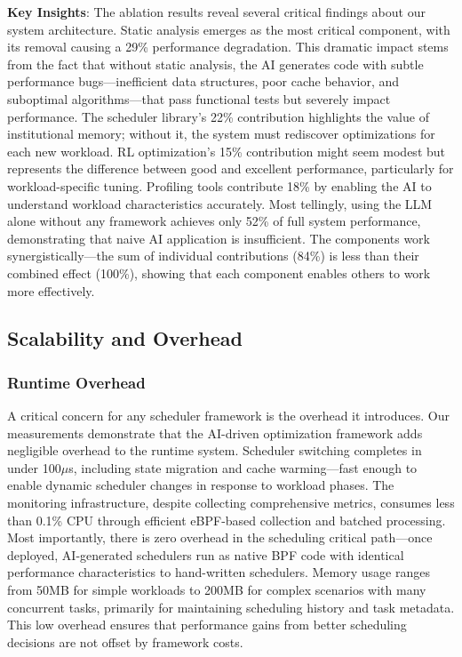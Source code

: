 \textbf{Key Insights}: The ablation results reveal several critical findings about our system architecture. Static analysis emerges as the most critical component, with its removal causing a 29\% performance degradation. This dramatic impact stems from the fact that without static analysis, the AI generates code with subtle performance bugs—inefficient data structures, poor cache behavior, and suboptimal algorithms—that pass functional tests but severely impact performance. The scheduler library's 22\% contribution highlights the value of institutional memory; without it, the system must rediscover optimizations for each new workload. RL optimization's 15\% contribution might seem modest but represents the difference between good and excellent performance, particularly for workload-specific tuning. Profiling tools contribute 18\% by enabling the AI to understand workload characteristics accurately. Most tellingly, using the LLM alone without any framework achieves only 52\% of full system performance, demonstrating that naive AI application is insufficient. The components work synergistically—the sum of individual contributions (84\%) is less than their combined effect (100\%), showing that each component enables others to work more effectively.

\subsection{Scalability and Overhead}

\subsubsection{Runtime Overhead}
A critical concern for any scheduler framework is the overhead it introduces. Our measurements demonstrate that the AI-driven optimization framework adds negligible overhead to the runtime system. Scheduler switching completes in under 100$\mu$s, including state migration and cache warming—fast enough to enable dynamic scheduler changes in response to workload phases. The monitoring infrastructure, despite collecting comprehensive metrics, consumes less than 0.1\% CPU through efficient eBPF-based collection and batched processing. Most importantly, there is zero overhead in the scheduling critical path—once deployed, AI-generated schedulers run as native BPF code with identical performance characteristics to hand-written schedulers. Memory usage ranges from 50MB for simple workloads to 200MB for complex scenarios with many concurrent tasks, primarily for maintaining scheduling history and task metadata. This low overhead ensures that performance gains from better scheduling decisions are not offset by framework costs.

